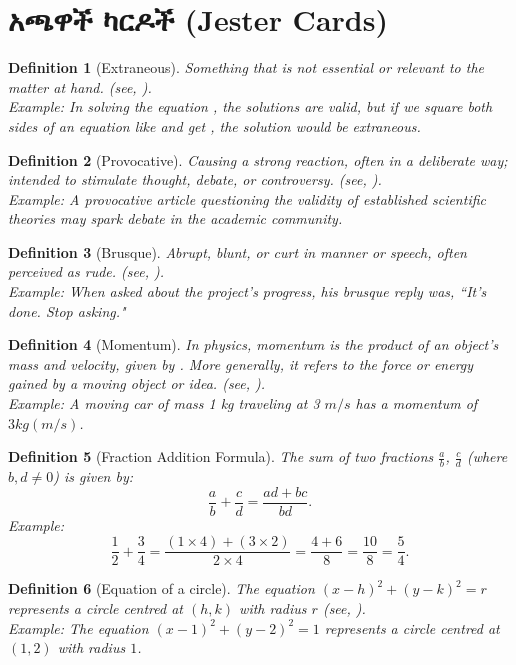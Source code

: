 \documentclass[a4paper,12pt]{article}
\newenvironment{geez}{\geezfont}{}
\theoremstyle{mystyle}
\newtheorem{definition}{Definition}
\numberwithin{equation}{section}
\numberwithin{theorem}{section}
\numberwithin{proposition}{section}
\numberwithin{example}{section}
\numberwithin{remark}{section}
\numberwithin{lemma}{section}
\numberwithin{corollary}{section}
\numberwithin{definition}{section}
\numberwithin{amharicdefinition}{section}
\begin{document}
\section{\begin{geez}አጫዋች ካርዶች (Jester Cards)\end{geez}}
\label{S:2}
\begin{definition}[Extraneous]Something that is not essential or relevant to the matter at hand. (see, \cite{dictionary2002merriam}).\\
Example: In solving the equation , the solutions are valid, but if we square both sides of an equation like and get , the solution would be extraneous.
\end{definition}
\begin{definition}[Provocative]Causing a strong reaction, often in a deliberate way; intended to stimulate thought, debate, or controversy.  (see,  \cite{dictionary1989oxford}).\\
Example: A provocative article questioning the validity of established scientific theories may spark debate in the academic community.
\end{definition}
\begin{definition}[Brusque]Abrupt, blunt, or curt in manner or speech, often perceived as rude. (see, \cite{miller2013cambridge}).\\
Example:  When asked about the project's progress, his brusque reply was, ``It's done. Stop asking."
\end{definition}
\begin{definition}[Momentum] In physics, momentum is the product of an object's mass and velocity, given by . More generally, it refers to the force or energy gained by a moving object or idea. (see, \cite{halliday2013fundamentals}).\\
Example: A moving car of mass 1 kg traveling at 3 $m/s$ has a momentum of  $3 kg(m/s)$.
\end{definition}
\begin{definition}[Fraction Addition Formula] The sum of two fractions $\frac{a}{b}$, $\frac{c}{d}$ (where $b,d\ne 0$) is given by:
$$\frac{a}{b}+\frac{c}{d}=\frac{ad+bc}{bd}.$$
Example: $$\frac{1}{2} + \frac{3}{4} = \frac{(1 \times 4) + (3 \times 2)}{2 \times 4} = \frac{4+6}{8} = \frac{10}{8} = \frac{5}{4}.$$
\end{definition}
\begin{definition}[Equation of a circle] The equation $(x-h)^2+(y-k)^2=r$ represents a circle centred at $(h,k)$ with radius $r$ (see, \cite{stewart2012calculus}).\\
Example:
The equation $(x-1)^2+(y-2)^2=1$ represents a circle centred at $(1,2)$ with radius $1$.
\end{definition}
\end{document}
